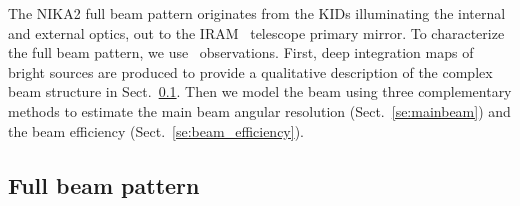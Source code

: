 
{\lp The NIKA2 full beam pattern originates from the KIDs illuminating the internal
and external optics, out to the IRAM \trentemetre\ telescope primary mirror.}
To characterize the full beam pattern, we use \bm\ observations. First,
deep integration maps of bright sources are produced to provide a
qualitative description of the complex beam structure in
Sect.~\ref{se:fullbeam}. Then we model the beam using three
complementary methods to estimate the main beam angular resolution
(Sect.~\ref{se:mainbeam}) and the beam efficiency
(Sect.~\ref{se:beam_efficiency}).

\subsection{Full beam pattern}
\label{se:fullbeam}


